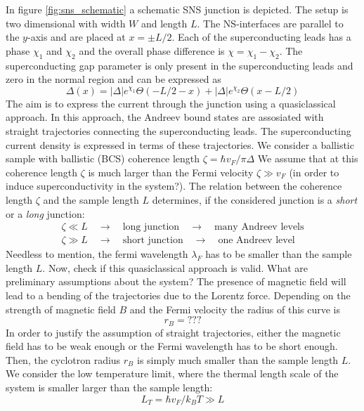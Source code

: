 In figure \ref{fig:sns_schematic} a schematic SNS junction is depicted. The setup is two dimensional with width $W$ and length $L$. The NS-interfaces are parallel to the $y$-axis and are placed at $x = \pm L/2$. Each of the superconducting leads has a phase $\chi_{1}$ and $\chi_{2}$ and the overall phase difference is $\chi = \chi_{1} - \chi_{2}$. The superconducting gap parameter is only present in the superconducting leads and zero in the normal region and can be expressed as
\begin{equation}
\Delta\left( x \right) = |\Delta| e^{\chi_1} \Theta\left(-L/2 -x \right) + |\Delta| e^{\chi_2} \Theta\left(x-L/2 \right) 
\label{eq:gap_parameter}
\end{equation}
The aim is to express the current through the junction using a quasiclassical approach. In this approach, the Andreev bound states are assosiated with straight trajectories connecting the superconducting leads. The superconducting current density is expressed in terms of these trajectories. We consider a ballistic sample with ballistic (BCS) coherence length $\zeta = \hbar v_F / \pi \Delta$ %
We assume that at this coherence length $\zeta$ is much larger than the Fermi velocity $\zeta \gg v_F$ (in order to induce superconductivity in the system?). The relation between the coherence length $\zeta$ and the sample length $L$ determines, if the considered junction is a \textit{short} or a \textit{long} junction:
\begin{eqnarray*}
\zeta \ll L \quad \rightarrow \quad \text{long junction} \quad \rightarrow \quad \text{many Andreev levels} \\ 
\zeta \gg L \quad \rightarrow \quad \text{short junction} \quad \rightarrow \quad \text{one Andreev level} 
\end{eqnarray*}
Needless to mention, the fermi wavelength $\lambda_F$ has to be smaller than the sample length $L$. 
Now, check if this quasiclassical approach is valid. What are preliminary assumptions about the system?
The presence of magnetic field will lead to a bending of the trajectories due to the Lorentz force. Depending on the strength of magnetic field $B$ and the Fermi velocity the radius of this curve is 
\begin{equation}
r_B = ???
\end{equation}
In order to justify the assumption of straight trajectories, either the magnetic field has to be weak enough or the Fermi wavelength has to be short enough. Then, the cyclotron radius $r_B$ is simply much smaller than the sample length $L$. 
We consider the low temperature limit, where the thermal length scale of the system is smaller larger than the sample length:
\begin{equation}
L_T = \hbar v_F / k_B T \gg L
\end{equation} 


